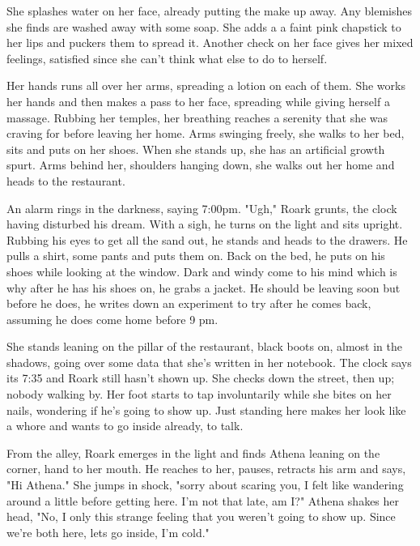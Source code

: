         She splashes water on her face, already putting the make up away. Any blemishes she finds are washed away with some soap. She adds a
    a faint pink chapstick to her lips and puckers them to spread it. Another check on her face gives her mixed feelings, satisfied since she
    can't think what else to do to herself.

        Her hands runs all over her arms, spreading a lotion on each of them. She works her hands and then makes a pass to her face, spreading
    while giving herself a massage. Rubbing her temples, her breathing reaches a serenity that she was craving for before leaving her home.
    Arms swinging freely, she walks to her bed, sits and puts on her shoes. When she stands up, she has an artificial growth spurt. Arms
    behind her, shoulders hanging down, she walks out her home and heads to the restaurant.

        An alarm rings in the darkness, saying 7:00pm. "Ugh," Roark grunts, the clock having disturbed his dream. With a sigh, he turns on the
    light and sits upright. Rubbing his eyes to get all the sand out, he stands and heads to the drawers. He pulls a shirt, some pants and
    puts them on. Back on the bed, he puts on his shoes while looking at the window. Dark and windy come to his mind which is why after he 
    has his shoes on, he grabs a jacket. He should be leaving soon but before he does, he writes down an experiment to try after he comes back,
    assuming he does come home before 9 pm.

        She stands leaning on the pillar of the restaurant, black boots on, almost in the shadows, going over some data that she's written in her notebook.
    The clock says its 7:35 and Roark still hasn't shown up. She checks down the street, then up; nobody walking by. Her foot starts to
    tap involuntarily while she bites on her nails, wondering if he's going to show up. Just standing here makes her look like a whore and
    wants to go inside already, to talk.

        From the alley, Roark emerges in the light and finds Athena leaning on the corner, hand to her mouth. He reaches to her, pauses,
    retracts his arm and says, "Hi Athena." She jumps in shock, "sorry about scaring you, I felt like wandering around a little before getting
    here. I'm not that late, am I?" Athena shakes her head, "No, I only this strange feeling that you weren't going to show up. Since we're
    both here, lets go inside, I'm cold."

